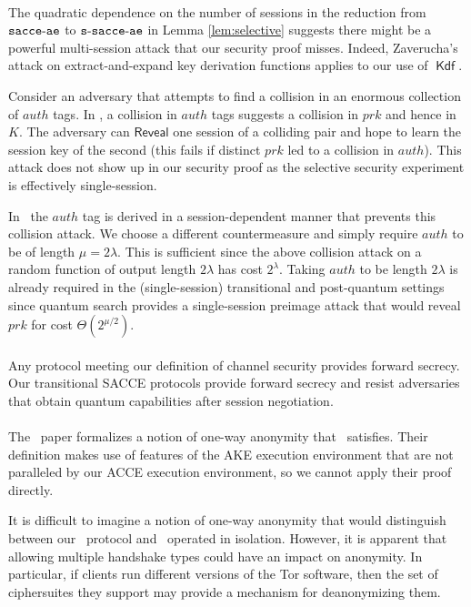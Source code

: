 \documentclass[USenglish,oneside,twocolumn]{article}
\theoremstyle{dgthm}
\theoremstyle{dgdef}
\newcommand{\ntor}{{\sf {ntor}}}
\newcommand{\hybrid}{{\sf {hybrid}}}
\newcommand{\AlgorithmName}[1]{\operatorname{\mathsf{#1}}}
\newcommand{\KDF}{\AlgorithmName{Kdf}}
\newcommand{\AdvInt}[1]{\mathsf{#1}}
\newcommand{\Reveal}{\AdvInt{Reveal}}
\newcommand{\Experiment}[1]{\operatorname{\tt{#1}}}
\begin{document}
    \\
    The quadratic dependence on the number of sessions in the reduction from
    $\Experiment{sacce-ae}$ to $\Experiment{s-sacce-ae}$ in Lemma
    \ref{lem:selective} suggests there might be a powerful multi-session attack
    that our security proof misses. Indeed, Zaverucha's attack
    \cite{Zaverucha2012} on extract-and-expand key derivation functions applies
    to our use of $\KDF$.

    Consider an adversary that attempts to find a collision in an enormous
    collection of $auth$ tags. In \hybrid, a collision in $auth$ tags suggests
    a collision in $prk$ and hence in $K$. The adversary can $\Reveal$ one
    session of a colliding pair and hope to learn the session key of the second
    (this fails if distinct $prk$ led to a collision in $auth$).  This attack
    does not show up in our security proof as the selective security experiment
    is effectively single-session.

    In \ntor~the $auth$ tag is derived in a session-dependent manner that
    prevents this collision attack. We choose a different countermeasure and
    simply require $auth$ to be of length $\mu = 2\lambda$. This is sufficient
    since the above collision attack on a random function of output length
    $2\lambda$ has cost $2^\lambda$.  Taking $auth$ to be length $2\lambda$ is
    already required in the (single-session) transitional and post-quantum
    settings since quantum search provides a single-session preimage attack
    that would reveal $prk$ for cost $\Theta(2^{\mu/2})$.\\

    \\
    Any protocol meeting our definition of channel security provides forward
    secrecy. Our transitional SACCE protocols provide forward secrecy and
    resist adversaries that obtain quantum capabilities after session
    negotiation.\\

    \\
    The \ntor~paper formalizes a notion of one-way anonymity that
    \ntor~satisfies. Their definition makes use of features of the AKE
    execution environment that are not paralleled by our ACCE execution
    environment, so we cannot apply their proof directly.

    It is difficult to imagine a notion of one-way anonymity that would
    distinguish between our \hybrid~protocol and \ntor~operated in isolation.
    However, it is apparent that allowing multiple handshake types could have
    an impact on anonymity. In particular, if clients run different versions of
    the Tor software, then the set of ciphersuites they support may provide a
    mechanism for deanonymizing them.
\end{document}
